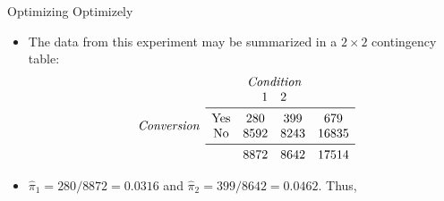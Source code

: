 \begin{Example}{Optimizing Optimizely}{}
\begin{itemize}
                  \centerline{$ H_0 $: $ \pi_1\ge \pi_2 $ versus $ H_\text{A} $: $ \pi_1<\pi_2 $}
            \item The data from this experiment may be summarized in a $ 2\times 2 $ contingency table:
                  \[
                        \begin{array}{c}
                              \\
                              \emph{Conversion}
                              \\
                        \end{array}
                        \begin{array}{ccc}
                                                         & \emph{Condition}           &                            \\
                                                         & \begin{matrix}
                                    1 & 2
                              \end{matrix} &                            \\
                              \midrule
                              \begin{matrix}
                                    \text{Yes} \\
                                    \text{No}
                              \end{matrix} & \begin{matrix}
                                    280  & 399  \\
                                    8592 & 8243
                              \end{matrix} & \begin{matrix}
                                    679 \\
                                    16835
                              \end{matrix} \\
                              \midrule
                                                         & \begin{matrix}
                                    8872 & 8642
                              \end{matrix} & 17514
                        \end{array}
                  \]
            \item $ \hat{\pi}_1=280/8872=0.0316 $ and $ \hat{\pi}_2=399/8642=0.0462 $. Thus,

\end{itemize}
\end{Example}
